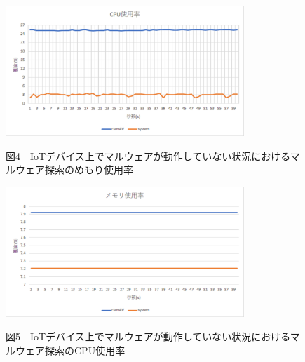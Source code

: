 \begin{figure}[h]
 \centering
    \includegraphics[width=90mm]{figures/CPU.eps}
 \label{fig:model}
 \begin{center}図4　IoTデバイス上でマルウェアが動作していない状況におけるマルウェア探索のめもり使用率\end{center}
 \end{figure}\begin{figure}[h]
 \centering
    \includegraphics[width=90mm]{figures/mem.eps}
 \label{fig:model}
 \begin{center}図5　IoTデバイス上でマルウェアが動作していない状況におけるマルウェア探索のCPU使用率\end{center}
 \end{figure}

